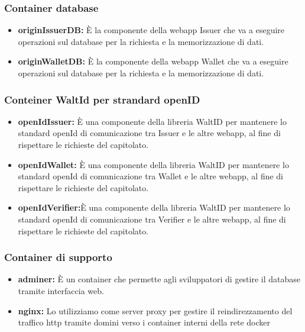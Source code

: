 \subsubsection{Container database}
\begin{itemize}
    \item \textbf{originIssuerDB:} È la componente della webapp Issuer che va a eseguire operazioni sul database per la richiesta e la memorizzazione di dati. 
    \item \textbf{originWalletDB:} È la componente della webapp Wallet che va a eseguire operazioni sul database per la richiesta e la memorizzazione di dati.
\end{itemize}

\subsubsection{Conteiner WaltId per strandard openID}
\begin{itemize}
    \item \textbf{openIdIssuer:} È una componente della libreria WaltID per mantenere lo standard openId di comunicazione tra Issuer e le altre webapp, al fine di rispettare le richieste del capitolato.
    \item \textbf{openIdWallet:} È una componente della libreria WaltID per mantenere lo standard openId di comunicazione tra Wallet e le altre webapp, al fine di rispettare le richieste del capitolato.
    \item \textbf{openIdVerifier:}È una componente della libreria WaltID per mantenere lo standard openId di comunicazione tra Verifier e le altre webapp, al fine di rispettare le richieste del capitolato.
\end{itemize}
 
\subsubsection{Container di supporto}
\begin{itemize}
    \item \textbf{adminer:} È un container che permette agli sviluppatori di gestire il database tramite interfaccia web.
    \item \textbf{nginx:} Lo utilizziamo come server proxy per gestire il reindirezzamento del traffico http tramite domini verso i container interni della rete docker
\end{itemize}






